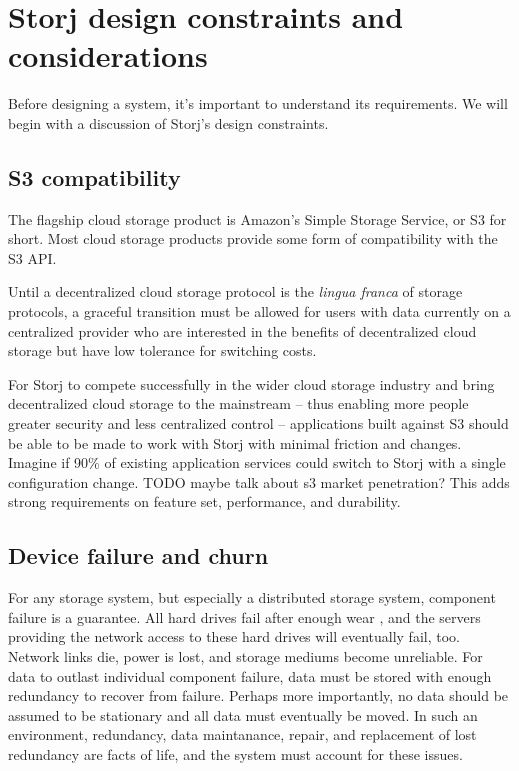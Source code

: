 \documentclass[a4paper,10pt]{article} \usepackage[utf8]{inputenc}
\newcommand{\todo}[1]{{\color{red} TODO #1 }}
\begin{document}
\section{Storj design constraints and
considerations}\label{sec:design_constraints}

Before designing a system, it's important to understand its requirements.
We will begin with a discussion of Storj's design constraints.

\subsection{S3 compatibility}

The flagship cloud storage product is Amazon's Simple Storage Service, or S3 for
short. Most cloud storage products provide some form of compatibility with the
S3 API.

Until a decentralized cloud storage protocol is the {\em lingua franca} of
storage protocols, a graceful transition must be allowed for users with data
currently on a centralized provider who are interested in the benefits of
 decentralized cloud storage but have low tolerance for switching costs.

For Storj to compete successfully in the wider cloud storage industry and bring
decentralized cloud storage to the mainstream -- thus enabling more people
greater security and less centralized control -- applications built against S3
should be able to be made to work with Storj with minimal friction and changes.
Imagine if 90\% of existing application services could switch to Storj with a
single configuration change. \todo{maybe talk about s3 market penetration?}
This adds strong requirements on feature set, performance, and durability.

\subsection{Device failure and churn}

For any storage system, but especially a distributed storage system, component
failure is a guarantee. All hard drives fail after enough wear
\cite{backblaze-hd-2018-q1}, and the servers providing the network access to
these hard drives will eventually fail, too. Network links die, power is lost,
and storage mediums become unreliable. For data to outlast individual component
failure, data must be stored with enough redundancy to recover from failure.
Perhaps more importantly, no data should be assumed to be stationary and all
data must eventually be moved. In such an environment, redundancy, data
maintanance, repair, and replacement of lost redundancy are facts of life, and
the system must account for these issues.
\end{document}
